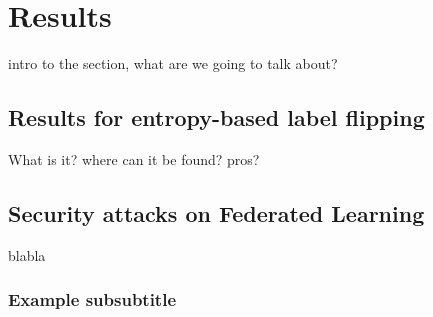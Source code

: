 \section{Results}
intro to the section, what are we going to talk about?
\subsection{Results for entropy-based label flipping}
What is it? where can it be found? pros?

\subsection{Security attacks on Federated Learning}
blabla

\subsubsection{Example subsubtitle}

\newpage
